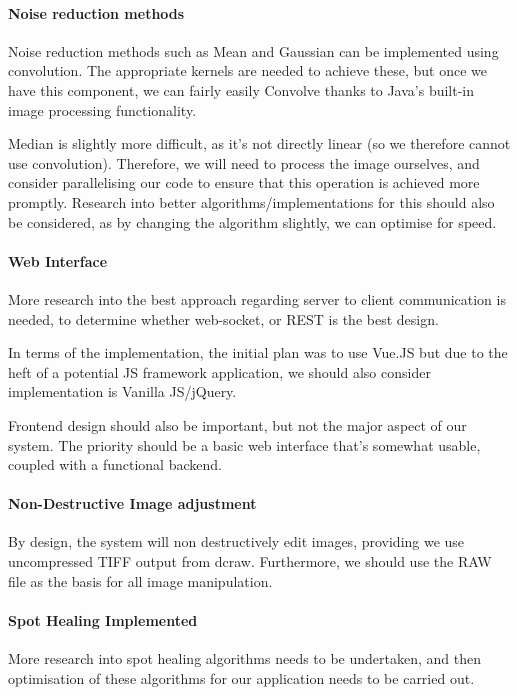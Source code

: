\documentclass[14pt]{article}
\begin{document}
  \paragraph{Noise reduction methods}
    Noise reduction methods such as Mean and Gaussian can be implemented using convolution.
    The appropriate kernels are needed to achieve these, but once we have this component, we can
    fairly easily Convolve thanks to Java's built-in image processing functionality.

    Median is slightly more difficult, as it's not directly linear (so we therefore cannot use convolution).
    Therefore, we will need to process the image ourselves, and consider parallelising our code to ensure
    that this operation is achieved more promptly. Research into better algorithms/implementations for this
    should also be considered, as by changing the algorithm slightly, we can optimise for speed.

  \paragraph{Web Interface}
    More research into the best approach regarding server to client communication is needed, to determine
    whether web-socket, or REST is the best design.

    In terms of the implementation, the initial plan was to use Vue.JS but due to the
    heft of a potential JS framework application, we should also consider
    implementation is Vanilla JS/jQuery.

    Frontend design should also be important, but not the major aspect of our system. The priority
    should be a basic web interface that's somewhat usable, coupled with a functional backend.

  \paragraph{Non-Destructive Image adjustment}
    By design, the system will non destructively edit images, providing we use uncompressed TIFF output from
    dcraw. Furthermore, we should use the RAW file as the basis for all image manipulation.

  \paragraph{Spot Healing Implemented}
    More research into spot healing algorithms needs to be undertaken, and then optimisation of these algorithms for our
    application needs to be carried out.
\end{document}
